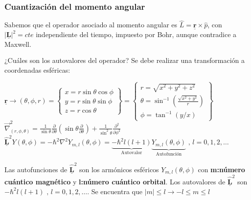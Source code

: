 \documentclass[oneside]{book}
\numberwithin{equation}{section}
\numberwithin{figure}{section}
\numberwithin{table}{section}
\newcommand{\vect}[1]{\underline{\textbf{#1}}}
\begin{document}
				\subsubsection{Cuantización del momento angular}
				
					Sabemos que el operador asociado al momento angular es $\hat{L}=\vect{r} \times \hat{p}$, con $\vert \vect{L} \vert^2=cte$ independiente del tiempo, impuesto por Bohr, aunque contradice a Maxwell.
					
					¿Cuáles son los autovalores del operador? Se debe realizar una transformación a coordenadas esféricas:
					
					\begin{center}
						$\vect{r} \longrightarrow (\theta,\phi,r)=\begin{Bmatrix}{x=r \sin \theta \cos \phi} \\ y=r \sin \theta \sin \phi \\ z=r \cos \theta \end{Bmatrix}=\begin{Bmatrix}{r=\sqrt{x^2+y^2+z^2}} \\ \theta=\sin^{-1} \left( \frac{\sqrt{x^2+y^2}}{r} \right) \\ \phi=\tan^{-1} \left( y/x \right) \end{Bmatrix}$\\
						
						$\vec{\nabla}^2_{(r,\phi,\theta)}=\frac{1}{\sin \theta}\frac{\partial}{\partial \theta} \left( \sin \theta \frac{\partial}{\partial \theta} \right)+\frac{1}{\sin^2 \theta}\frac{\partial^2}{\partial \phi^2}$\\
						
						$\hat{\vect{L}}^2 Y(\theta,\phi)=-\hbar^2 \nabla^2 Y_{m,l}(\theta,\phi)=\underbrace{-\hbar^2 l(l+1)}_{\text{Autovalor}}\underbrace{Y_{m,l}(\theta,\phi)}_{\text{Autofunción}} \text{ , } l=0,1,2,\ldots$
					\end{center}
				
					Las autofunciones de $\hat{\vect{L}}^2$ son los armónicos esféricos $Y_{m,l}(\theta,\phi)$ con \textbf{m:número cuántico magnético} y \textbf{l:número cuántico orbital}. Los autovalores de $\hat{\vect{L}}^2$ son $-\hbar^2 l(l+1) \text{ , } l=0,1,2,\ldots$. Se encuentra que $\vert m \vert \leq l \longrightarrow -l \leq m\leq l$
								
\end{document}

